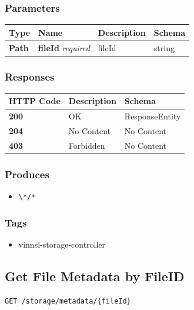 \subsubsection{Parameters}\label{parameters-15}

\begin{longtable}[]{@{}llll@{}}
\toprule
Type & Name & Description & Schema\tabularnewline
\midrule
\endhead
\textbf{Path} & \textbf{fileId} \emph{required} & fileId &
string\tabularnewline
\bottomrule
\end{longtable}

\subsubsection{Responses}\label{responses-19}

\begin{longtable}[]{@{}lll@{}}
\toprule
HTTP Code & Description & Schema\tabularnewline
\midrule
\endhead
\textbf{200} & OK & ResponseEntity\tabularnewline
\textbf{204} & No Content & No Content\tabularnewline
\textbf{403} & Forbidden & No Content\tabularnewline
\bottomrule
\end{longtable}

\subsubsection{Produces}\label{produces-19}

\begin{itemize}
\tightlist
\item
  \texttt{\textbackslash{}*/*}
\end{itemize}

\subsubsection{Tags}\label{tags-19}

\begin{itemize}
\tightlist
\item
  vinnsl-storage-controller
\end{itemize}

\subsection{Get File Metadata by
FileID}\label{get-file-metadata-by-fileid}

\begin{verbatim}
GET /storage/metadata/{fileId}
\end{verbatim}

